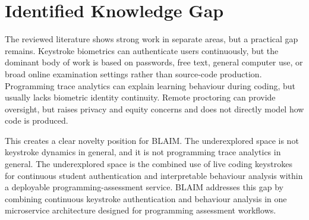 \section{Identified Knowledge Gap}
\label{sec:lit-gap}

The reviewed literature shows strong work in separate areas, but a practical gap remains. Keystroke biometrics can authenticate users continuously, but the dominant body of work is based on passwords, free text, general computer use, or broad online examination settings rather than source-code production. Programming trace analytics can explain learning behaviour during coding, but usually lacks biometric identity continuity. Remote proctoring can provide oversight, but raises privacy and equity concerns and does not directly model how code is produced.

This creates a clear novelty position for BLAIM. The underexplored space is not keystroke dynamics in general, and it is not programming trace analytics in general. The underexplored space is the combined use of live coding keystrokes for continuous student authentication and interpretable behaviour analysis within a deployable programming-assessment service. BLAIM addresses this gap by combining continuous keystroke authentication and behaviour analysis in one microservice architecture designed for programming assessment workflows.

\clearpage
